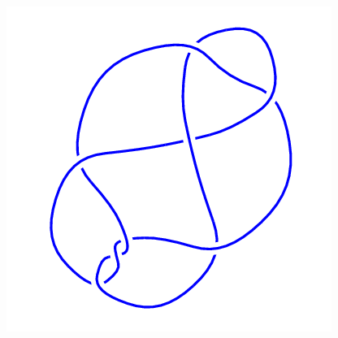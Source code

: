 \begin{figure}[H]
\begin{minipage}[b]{.18\linewidth}
	\end{minipage}
	\begin{minipage}[b]{.18\linewidth}
		\centering
		\includegraphics[width=\linewidth]{../data/8_11.png}
	\end{minipage}
\end{figure}
